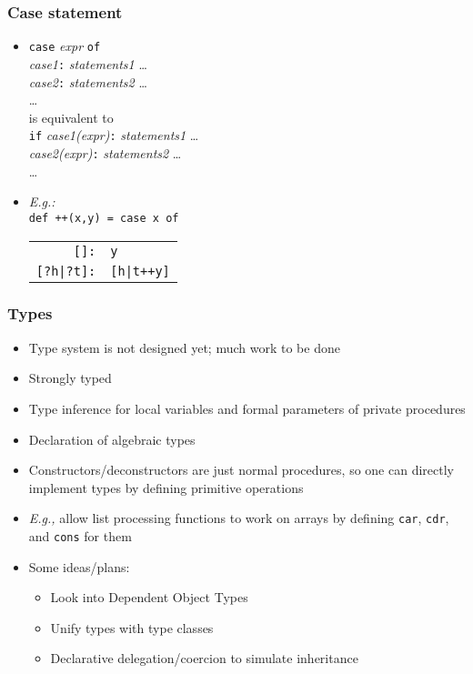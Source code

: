 \documentclass[12pt]{beamer}
\begin{document}
\begin{frame}
\frametitle{Case statement}
\begin{itemize}
\item \texttt{case} \emph{expr} \texttt{of} \\
\hspace*{1em} \emph{case1}\texttt{:} \emph{statements1} \ldots \\
\hspace*{1em} \emph{case2}\texttt{:} \emph{statements2} \ldots \\
\hspace*{1em} \ldots \\[2ex]
is equivalent to \\[2ex]
 \texttt{if} \emph{case1(expr)}\texttt{:} \emph{statements1} \ldots \\
\hspace*{1em} \emph{case2(expr)}\texttt{:} \emph{statements2} \ldots \\
\hspace*{1em} \ldots
\item \emph{E.g.:}\\
  \texttt{def ++(x,y) = case x of} \\
\hspace*{3em}
\begin{tabular}{rl}
\texttt{[]:} & \texttt{y}\\
\texttt{[?h|?t]:} & \texttt{[h|t++y]}\\
\end{tabular}
\end{itemize}
\end{frame}


\begin{frame}
\frametitle{Types}
\begin{itemize}
\item Type system is not designed yet; much work to be done
\item Strongly typed
\item Type inference for local variables and formal parameters of
  private procedures
\item Declaration of algebraic types
\item Constructors/deconstructors are just normal procedures, so one can
  directly implement types by defining primitive operations
\item \emph{E.g.,} allow list processing functions to work on arrays
  by defining \texttt{car}, \texttt{cdr}, and \texttt{cons} for them
\item Some ideas/plans:
  \begin{itemize}
  \item Look into Dependent Object Types
  \item Unify types with type classes
  \item Declarative delegation/coercion to simulate inheritance
  \end{itemize}
\end{itemize}
\end{frame}
\end{document}
